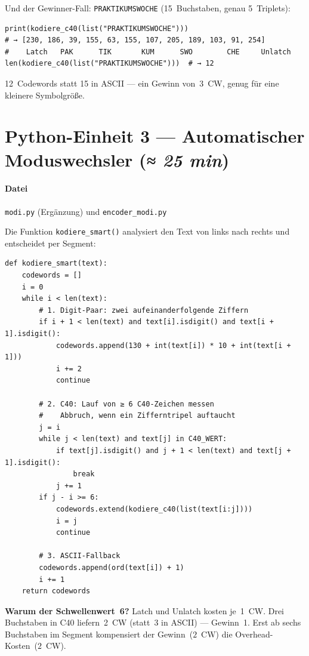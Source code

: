 Und der Gewinner-Fall: \texttt{PRAKTIKUMSWOCHE} (15~Buchstaben,
genau 5~Triplets):

\begin{verbatim}
print(kodiere_c40(list("PRAKTIKUMSWOCHE")))
# → [230, 186, 39, 155, 63, 155, 107, 205, 189, 103, 91, 254]
#    Latch   PAK      TIK       KUM      SWO        CHE     Unlatch
len(kodiere_c40(list("PRAKTIKUMSWOCHE")))  # → 12
\end{verbatim}

12~Codewords statt 15 in ASCII — ein Gewinn von~3~CW, genug für eine
kleinere Symbolgröße.

\section{Python-Einheit 3 — Automatischer Moduswechsler
         \normalfont(\textit{≈ 25 min})}

\paragraph{Datei} \texttt{modi.py} (Ergänzung) und \texttt{encoder\_modi.py}

Die Funktion \texttt{kodiere\_smart()} analysiert den Text von links nach
rechts und entscheidet per Segment:

\begin{verbatim}
def kodiere_smart(text):
    codewords = []
    i = 0
    while i < len(text):
        # 1. Digit-Paar: zwei aufeinanderfolgende Ziffern
        if i + 1 < len(text) and text[i].isdigit() and text[i + 1].isdigit():
            codewords.append(130 + int(text[i]) * 10 + int(text[i + 1]))
            i += 2
            continue

        # 2. C40: Lauf von ≥ 6 C40-Zeichen messen
        #    Abbruch, wenn ein Zifferntripel auftaucht
        j = i
        while j < len(text) and text[j] in C40_WERT:
            if text[j].isdigit() and j + 1 < len(text) and text[j + 1].isdigit():
                break
            j += 1
        if j - i >= 6:
            codewords.extend(kodiere_c40(list(text[i:j])))
            i = j
            continue

        # 3. ASCII-Fallback
        codewords.append(ord(text[i]) + 1)
        i += 1
    return codewords
\end{verbatim}

\textbf{Warum der Schwellenwert~6?} Latch und Unlatch kosten je~1~CW.
Drei Buchstaben in C40 liefern~2~CW (statt~3 in ASCII) — Gewinn~1.
Erst ab sechs Buchstaben im Segment kompensiert der Gewinn~($2$~CW)
die Overhead-Kosten~($2$~CW).

